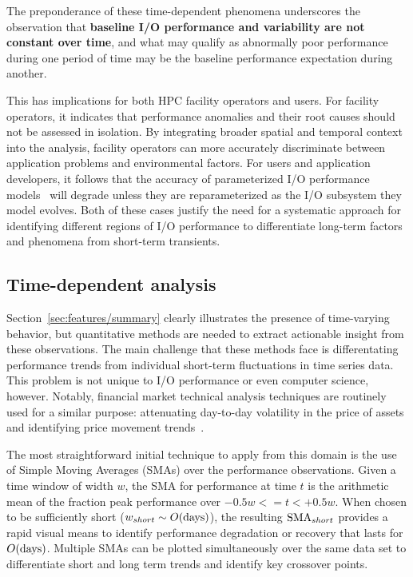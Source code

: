 The preponderance of these time-dependent phenomena underscores the observation that \textbf{baseline I/O performance and variability are not constant over time}, and
what may qualify as abnormally poor performance during one period of time may be the baseline performance expectation during another.

This has implications for both HPC facility operators and users.  For
facility operators, it indicates that performance anomalies and their root
causes should not be assessed in isolation. By integrating broader spatial and
temporal context into the analysis, facility operators can more accurately
discriminate between application problems and environmental factors.
For users and application developers, it follows that the accuracy of parameterized I/O performance models~\cite{Xie2012,Madireddy2017} will degrade unless they are reparameterized as the I/O subsystem they model evolves.
Both of these cases justify the need for a systematic approach for identifying different regions of I/O performance to differentiate long-term factors and phenomena from short-term transients.

\subsection{Time-dependent analysis} \label{sec:features/timedependent}

Section~\ref{sec:features/summary} clearly illustrates the presence of
time-varying behavior, but quantitative methods are needed to extract 
actionable insight from these observations.  The main challenge that these
methods face is differentating performance trends from individual short-term
fluctuations in time series data.
This problem is not unique to I/O performance or even computer science,
however.  Notably, financial market technical analysis techniques are
routinely used for a similar purpose: attenuating day-to-day volatility in
the price of assets and identifying price movement
trends~\cite{james1968monthly,gunasekarage2001profitability}.  

The most straightforward initial technique to apply from this domain is
the use of Simple Moving Averages (SMAs) over the performance observations.
Given a time window of width $w$, the SMA for performance at time $t$ is the arithmetic mean of the fraction peak performance over ${-0.5w <= t < +0.5w}$.
When chosen to be sufficiently short (${w_{short} \sim O(\textup{days})}$),
the resulting $\textup{SMA}_{short}$ provides a rapid visual means to
identify performance degradation or recovery that lasts for
$O(\textup{days})$.  Multiple SMAs can be plotted simultaneously over the
same data set to differentiate short and long term trends and identify key
crossover points. 

